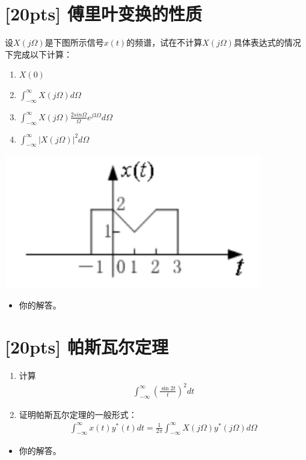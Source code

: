 \documentclass[a4paper,UTF8]{article}
\numberwithin{equation}{section}
\begin{document}
\section{[20pts] 傅里叶变换的性质 }
设$X(j\Omega)$是下图所示信号$x(t)$的频谱，试在不计算$X(j\Omega)$具体表达式的情况下完成以下计算：
\begin{enumerate}[(1)]
	\item $X(0)$
	\item $\displaystyle\int^{\infty}_{-\infty}X(j\Omega)d\Omega$
	\item $\displaystyle\int^{\infty}_{-\infty}X(j\Omega)\frac{2sin\Omega}{\Omega}e^{j3\Omega}d\Omega$
	\item $\displaystyle\int^{\infty}_{-\infty}\left|X(j\Omega)\right|^2d\Omega$
\end{enumerate}
\includegraphics[scale=0.4]{3.png}

\begin{framed}
\begin{spacing}{1.5}
    \begin{itemize}
        \item 你的解答。
    \end{itemize}
\end{spacing}
\end{framed}


\newpage
\section{[20pts] 帕斯瓦尔定理 }
\begin{enumerate}[(1)]
    \item 计算
    \begin{equation*}
        \begin{aligned}
        \int^{\infty}_{-\infty}\left(\frac{\sin 2t}{t}\right)^2dt
        \end{aligned}
    \end{equation*}
	\item 证明帕斯瓦尔定理的一般形式：
	\begin{equation*}
        \begin{aligned}
        \int^{\infty}_{-\infty}x(t)y^{*}(t)dt=\frac{1}{2\pi}\int^{\infty}_{-\infty}X(j\Omega)y^{*}(j\Omega)d\Omega
        \end{aligned}
    \end{equation*}
\end{enumerate}

\begin{framed}
\begin{spacing}{1.5}
    \begin{itemize}
        \item 你的解答。
    \end{itemize}
\end{spacing}
\end{framed}


\newpage
\end{document}
